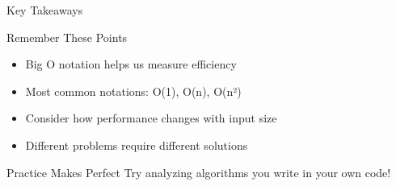 \documentclass{beamer}
\begin{document}
\begin{frame}{Key Takeaways}
    \begin{block}{Remember These Points}
        \begin{itemize}
            \item Big O notation helps us measure efficiency
            \item Most common notations: O(1), O(n), O(n²)
            \item Consider how performance changes with input size
            \item Different problems require different solutions
        \end{itemize}
    \end{block}
    
    \begin{alertblock}{Practice Makes Perfect}
        Try analyzing algorithms you write in your own code!
    \end{alertblock}
\end{frame}
\end{document}
